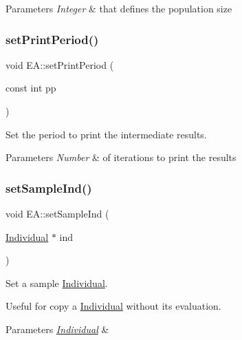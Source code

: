 \begin{DoxyParams}{Parameters}
{\em Integer} & that defines the population size \\
\hline
\end{DoxyParams}
\mbox{\label{classEA_a161b549d8ec90da1bd07687f6b388b59}} 
\subsubsection{\texorpdfstring{set\+Print\+Period()}{setPrintPeriod()}}
{\footnotesize\ttfamily void E\+A\+::set\+Print\+Period (\begin{DoxyParamCaption}\item[{const int}]{pp }\end{DoxyParamCaption})\hspace{0.3cm}{\ttfamily [inline]}}



Set the period to print the intermediate results. 


\begin{DoxyParams}{Parameters}
{\em Number} & of iterations to print the results \\
\hline
\end{DoxyParams}
\mbox{\label{classEA_add9a924cd307b2a49b1cf961c65e8ef2}} 
\subsubsection{\texorpdfstring{set\+Sample\+Ind()}{setSampleInd()}}
{\footnotesize\ttfamily void E\+A\+::set\+Sample\+Ind (\begin{DoxyParamCaption}\item[{\mbox{\hyperlink{classIndividual}{Individual}} $\ast$}]{ind }\end{DoxyParamCaption})\hspace{0.3cm}{\ttfamily [inline]}}



Set a sample \mbox{\hyperlink{classIndividual}{Individual}}. 

Useful for copy a \mbox{\hyperlink{classIndividual}{Individual}} without its evaluation. 
\begin{DoxyParams}{Parameters}
{\em \mbox{\hyperlink{classIndividual}{Individual}}} & \\
\hline
\end{DoxyParams}
\mbox{\label{classEA_a61c0385f3596233e124a9002e834fc6a}} 
